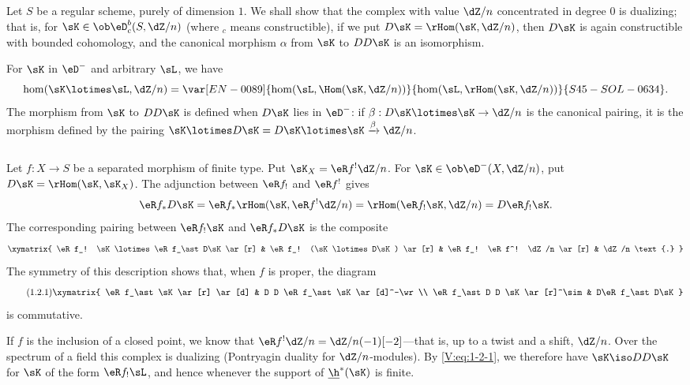 \subsection{}\label{V:1-1}

Let $S$ be a regular scheme, purely of dimension $1$. We shall show that the
complex with value $\dZ/n$ concentrated in degree $0$ is dualizing; that is,
for $\sK\in \ob\eD_c^b(S,\dZ/n)$ (where ${}_c$ means constructible), if we
put $D\sK=\rHom(\sK,\dZ/n)$, then $D\sK$ is again
constructible with bounded cohomology, and the canonical morphism $\alpha$
from $\sK$ to $D D\sK$ is an isomorphism.

For $\sK$ in $\eD^-$ and arbitrary $\sL$, we have
\[
  \hom(\sK\lotimes \sL,\dZ/n) = \var[EN-0089]{\hom(\sL,\Hom(\sK,\dZ/n))}{\hom(\sL,\rHom(\sK,\dZ/n))}{S45-SOL-0634} \text{.}
\]
The morphism from $\sK$ to $DD\sK$ is defined when $D\sK$ lies in $\eD^-$:
if $\beta:D\sK\lotimes\sK\to \dZ/n$ is the canonical pairing, it is the
morphism defined by the pairing
$\sK\lotimes D\sK=D\sK\lotimes \sK \xrightarrow\beta \dZ/n$.


\subsection{}\label{V:1-2}

Let $f:X\to S$ be a separated morphism of finite type. Put
$\sK_X=\eR f^!\dZ/n$. For $\sK\in \ob\eD^-(X,\dZ/n)$, put
$D\sK = \rHom(\sK,\sK_X)$. The adjunction between $\eR f_!$ and $\eR f^!$
gives
\[
  \eR f_\ast D\sK = \eR f_\ast \rHom(\sK,\eR f^! \dZ/n) = \rHom(\eR f_! \sK,\dZ/n) = D\eR f_! \sK \text{.}
\]
The corresponding pairing between $\eR f_!\sK$ and $\eR f_\ast D\sK$ is the composite
\[\xymatrix{
  \eR f_! \sK\lotimes \eR f_\ast D\sK \ar[r]
    & \eR f_! (\sK\lotimes D\sK) \ar[r]
    & \eR f_! \eR f^! \dZ/n \ar[r]
    & \dZ/n \text{.}
}\]
The symmetry of this description shows that, when $f$ is proper, the diagram
\begin{equation*}\tag{1.2.1}\label{V:eq:1-2-1}
\xymatrix{
  \eR f_\ast \sK \ar[r] \ar[d]
    & D D \eR f_\ast \sK \ar[d]^-\wr \\
  \eR f_\ast D D \sK \ar[r]^\sim
    & D\eR f_\ast D\sK
}
\end{equation*}
is commutative.

If $f$ is the inclusion of a closed point, we know that
$\eR f^!\dZ/n=\dZ/n(-1)[-2]$---that is, up to a twist and a shift, $\dZ/n$.
Over the spectrum of a field this complex is dualizing (Pontryagin duality
for $\dZ/n$-modules). By \eqref{V:eq:1-2-1}, we therefore have
$\sK\iso D D\sK$ for $\sK$ of the form $\eR f_!\sL$, and hence whenever the
support of $\underline\h^*(\sK)$ is finite.


